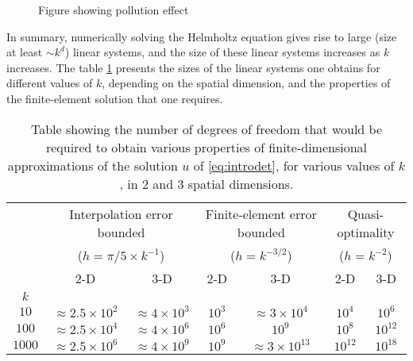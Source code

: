 \begin{figure}
\caption{\label{fig:intropoll} Figure showing pollution effect}
\end{figure}


In summary, numerically solving the Helmholtz equation gives rise to large (size at least $ \sim k^d$) linear systems, and the size of these linear systems increases as $k$ increases. The table \cref{tab:introlinsys} presents the sizes of the linear systems one obtains for different values of $k$, depending on the spatial dimension, and the properties of the finite-element solution that one requires.
\begin{table}
\begin{tabular}{c|cccccc}
 &\multicolumn{2}{c}{Interpolation error bounded}&\multicolumn{2}{c}{Finite-element error bounded}&\multicolumn{2}{c}{Quasi-optimality}\\
    &\multicolumn{2}{c}{($h = \pi/5 \times k^{-1}$)}&\multicolumn{2}{c}{($h = k^{-3/2}$)}&\multicolumn{2}{c}{($h = k^{-2}$)}\\
&2-D&3-D&2-D&3-D&2-D&3-D\\
\hline
$k$&&&&&&\\
$10$&$\approx 2.5\times 10^2$&$\approx 4 \times 10^3$&$10^3$&$\approx 3 \times 10^4$&$10^4$&$10^6$\\
$100$&$\approx 2.5\times 10^4$&$\approx 4 \times 10^6$&$10^6$&$10^9$&$10^8$&$10^{12}$\\
$1000$&$\approx 2.5\times 10^6$&$\approx 4 \times 10^9$&$10^9$&$\approx 3 \times 10^{13}$&$10^{12}$&$10^{18}$
\end{tabular}
\caption{\label{tab:introlinsys}Table showing the number of degrees of freedom that would be required to obtain various properties of finite-dimensional approximations of the solution $u$ of \eqref{eq:introdet}, for various values of $k$, in 2 and 3 spatial dimensions.}
\end{table}



